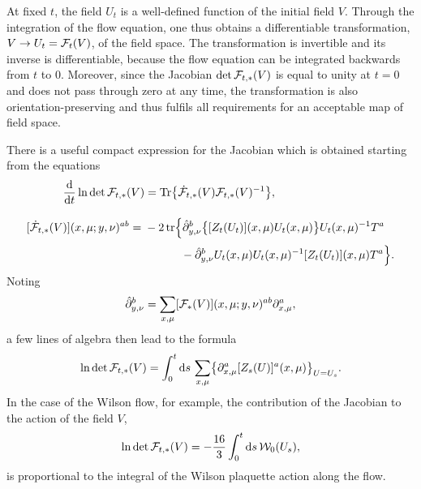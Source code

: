 At fixed $t$, the field $U_t$ is a well-defined
function of the initial field $V$. Through the
integration of the flow equation, one thus obtains a
differentiable transformation, $V\to U_t=\mathcal{F}_{t}(V)$, of the
field space. The transformation is invertible and its
inverse is differentiable, because
the flow equation can be integrated backwards from
$t$ to $0$.
Moreover,
since the Jacobian $\det\mathcal{F}_{t,*}(V)$
is equal to unity at $t=0$ and
does not pass through zero at any time,
the transformation is also
orientation-preserving and thus fulfils all
requirements for an acceptable map of field space.

There is a useful compact expression for the Jacobian
which is obtained starting from the equations
\begin{align}
  {\mathrm{d}\over\mathrm{d}t}\ln\det\mathcal{F}_{t,*}(V)
  &=\mathrm{Tr}\bigl\{\dot{\mathcal{F}}_{t,*}(V)\mathcal{F}_{t,*}(V)^{-1}\bigr\},
  \\[2.0ex]
  [\dot{\mathcal{F}}_{t,*}(V)](x,\mu;y,\nu)^{ab}
  ={}&-2\,\mathrm{tr}\Bigl\{\hat{\partial}^b_{y,\nu}\bigl\{[Z_t(U_t)](x,\mu)U_t(x,\mu)\bigr\}
  U_t(x,\mu)^{-1}T^a
  \notag\\[0.5ex]
  &\hspace{3.2em}-\hat{\partial}^b_{y,\nu}U_t(x,\mu)U_t(x,\mu)^{-1}
  [Z_t(U_t)](x,\mu)T^a\Bigr\}.
\end{align}
Noting
\begin{equation}
  \hat{\partial}^b_{y,\nu}=\sum_{x,\mu}[\mathcal{F}_{*}(V)](x,\mu;y,\nu)^{ab}
  \partial^a_{x,\mu},
\end{equation}
a few lines of algebra then lead to the formula
\begin{equation}
  \ln\det\mathcal{F}_{t,*}(V)=\int_0^t\mathrm{d} s\,\sum_{x,\mu}
  \bigl\{\partial^a_{x,\mu}[Z_s(U)]^a(x,\mu)\bigr\}_{U=U_s}.
\end{equation}
In the case of the Wilson flow, for example, the contribution
of the Jacobian to the action of the field $V$,
\begin{equation}
  \ln\det\mathcal{F}_{t,*}(V)=-\frac{16}{3}\int_0^t\mathrm{d} s\,\mathcal{W}_0(U_s),
\end{equation}
is proportional to the integral of
the Wilson plaquette action along the flow.
